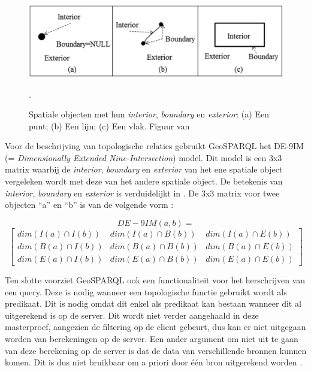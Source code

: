 \documentclass[twocolumn]{phdsymp} %
\begin{document}
\begin{figure}[ht]
    \centering
    \includegraphics[width=\linewidth]{images/spatial_objects_DE-9IM.png}
    \caption{Spatiale objecten met hun \textit{interior}, \textit{boundary} en \textit{exterior}: (a) Een punt; (b) Een lijn; (c) Een vlak. Figuur van \protect\cite{shen2018classification}}.
    \label{fig:abstr_de-9im}
\end{figure}

Voor de beschrijving van topologische relaties gebruikt GeoSPARQL het DE-9IM (= \textit{Dimensionally Extended Nine-Intersection}) model. Dit model is een 3x3 matrix waarbij de \textit{interior}, \textit{boundary} en \textit{exterior} van het ene spatiale object vergeleken wordt met deze van het andere spatiale object. De betekenis van \textit{interior}, \textit{boundary} en \textit{exterior} is verduidelijkt in . De 3x3 matrix voor twee objecten ``a'' en ``b'' is van de volgende vorm \cite{shen2018classification}:

\begin{equation*}
    DE-9IM(a,b) = 
\end{equation*}
\begin{equation*}
    \begin{bmatrix}
        dim(I(a)\cap I(b)) & dim(I(a)\cap B(b)) & dim(I(a)\cap E(b))\\
        dim(B(a)\cap I(b)) & dim(B(a)\cap B(b)) & dim(B(a)\cap E(b))\\
        dim(E(a)\cap I(b)) & dim(E(a)\cap B(b)) & dim(E(a)\cap E(b))
    \end{bmatrix}
\end{equation*}

Ten slotte voorziet GeoSPARQL ook een functionaliteit voor het herschrijven van een query. Deze is nodig wanneer een topologische functie gebruikt wordt als predikaat. Dit is nodig omdat dit enkel als predikaat kan bestaan wanneer dit al uitgerekend is op de server. Dit wordt niet verder aangehaald in deze masterproef, aangezien de filtering op de client gebeurt, dus kan er niet uitgegaan worden van berekeningen op de server. Een ander argument om niet uit te gaan van deze berekening op de server is dat de data van verschillende bronnen kunnen komen. Dit is dus niet bruikbaar om a priori door één bron uitgerekend worden \cite{ogcdocs}.
\end{document}
